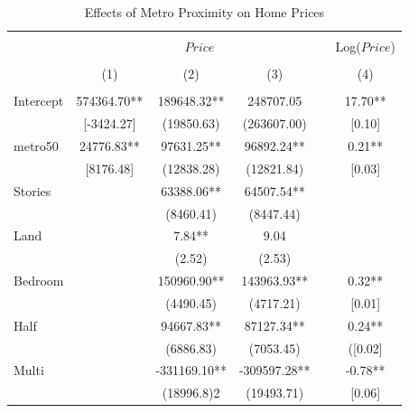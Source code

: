 \documentclass[12pt]{report}
\begin{document}
\begin{table}[h!]
\centering
\begin{threeparttable}

\caption{Effects of Metro Proximity on Home Prices}
\begin{tabular}{lccccc} 
\hline\hline\\[0.001ex]
         &           \multicolumn{4}{c}{$Price$} &                        \multicolumn{1}{c}{Log($Price$)}                 \\ [0.1ex] \cline{2-4} \cline{6-6}  
\\[0.001ex]
         &                   (1) &              (2) &                      (3) &&                            (4) \\ [0.5ex] 
\hline \\[0.1ex]
Intercept&	574364.70\footnotesize***&	189648.32\footnotesize***&	248707.05&&	17.70\footnotesize*** \\
&	\footnotesize[-3424.27]&	\footnotesize(19850.63)&	\footnotesize(263607.00)&&	\footnotesize[0.10] \\
metro50&	24776.83\footnotesize***&	97631.25\footnotesize***&	96892.24\footnotesize***&&	0.21\footnotesize*** \\
&	\footnotesize[8176.48]&	\footnotesize(12838.28)&	\footnotesize(12821.84)&&	\footnotesize[0.03] \\
Stories&	&	63388.06\footnotesize***&	64507.54\footnotesize***&	 \\
&	&	\footnotesize(8460.41)&	\footnotesize(8447.44)	&& \\
Land&	 &	7.84\footnotesize***&	9.04&	& \\
&	&	\footnotesize(2.52)&	\footnotesize(2.53)&	& \\
Bedroom&	&	150960.90\footnotesize***&	143963.93\footnotesize***&&	0.32\footnotesize*** \\
&	&	\footnotesize(4490.45)&	\footnotesize(4717.21)&&	\footnotesize[0.01]\\
Half&	&	94667.83\footnotesize***&	87127.34\footnotesize***&&	0.24\footnotesize*** \\
&	&	\footnotesize(6886.83)&	\footnotesize(7053.45)&&	\footnotesize([0.02]\\
Multi&	&	-331169.10\footnotesize***&	-309597.28\footnotesize***&&	-0.78\footnotesize*** \\
&	&	\footnotesize(18996.8)2&	\footnotesize(19493.71)&&	\footnotesize[0.06] \\

\end{tabular}
\end{threeparttable}
\end{table}
\end{document}
